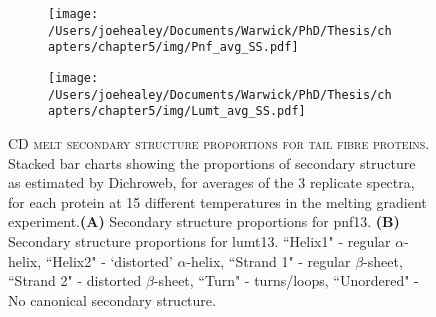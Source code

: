 \begin{figure}[p]
	\vspace{-0.2cm}
	\centering
	\begin{subfigure}{\textwidth}
	\texttt{[image: /Users/joehealey/Documents/Warwick/PhD/Thesis/chapters/chapter5/img/Pnf\_avg\_SS.pdf]}
	\captionsetup{singlelinecheck=off, justification=centering, font=footnotesize, aboveskip=7pt}
	\caption{}
	\label{pnfss}
	\end{subfigure}
	
	\begin{subfigure}{\textwidth}
	\texttt{[image: /Users/joehealey/Documents/Warwick/PhD/Thesis/chapters/chapter5/img/Lumt\_avg\_SS.pdf]}
	\captionsetup{singlelinecheck=off, justification=centering, font=footnotesize, aboveskip=7pt}
	\caption{}
	\label{lumtss}
	\end{subfigure}
	
	\captionsetup{singlelinecheck=off, justification=justified, font=footnotesize, aboveskip=8pt}
	\caption[PVC Tail fibre secondary structure proportions across the melting gradient]{\textsc{\normalsize CD melt secondary structure proportions for tail fibre proteins.} \vspace{0.1cm} \newline Stacked bar charts showing the proportions of secondary structure as estimated by Dichroweb, for averages of the 3 replicate spectra, for each protein at 15 different temperatures in the melting gradient experiment.\textbf{(A)} Secondary structure proportions for pnf13. \textbf{(B)} Secondary structure proportions for lumt13. ``Helix1" - regular $\alpha$-helix, ``Helix2" - `distorted' $\alpha$-helix, ``Strand 1" - regular $\beta$-sheet, ``Strand 2" - distorted $\beta$-sheet, ``Turn" - turns/loops, ``Unordered" - No canonical secondary structure.}
	\label{tailfibresbars}
\end{figure}

\newpage
